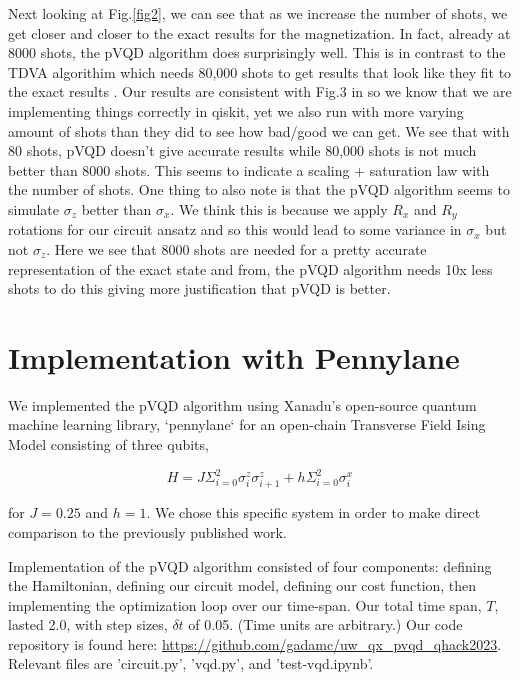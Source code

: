 \documentclass{article}
\begin{document}
 \newline \newline
 Next looking at Fig.\ref{fig2}, we can see that as we increase the number of shots, we get closer and closer to the exact results for the magnetization. In fact, already at 8000 shots, the pVQD algorithm does surprisingly well. This is in contrast to the TDVA algorithim which needs 80,000 shots to get results that look like they fit to the exact results \cite{PhysRevX.7.021050}. Our results are consistent with Fig.3 in \cite{Barison_2021} so we know that we are implementing things correctly in qiskit, yet we also run with more varying amount of shots than they did to see how bad/good we can get. We see that with 80 shots, pVQD doesn't give accurate results while  80,000 shots is not much better than 8000 shots. This seems to indicate a scaling + saturation law with the number of shots. One thing to also note is that the pVQD algorithm seems to simulate $\sigma_z$ better than $\sigma_x$. We think this is because we apply $R_x$ and $R_y$ rotations for our circuit ansatz and so this would lead to some variance in $\sigma_x$ but not $\sigma_z$. Here we see that 8000 shots are needed for a pretty accurate representation of the exact state and from\cite{Barison_2021}, the pVQD algorithm needs 10x less shots to do this giving more justification that pVQD is better.

\section{Implementation with Pennylane}

We implemented the pVQD algorithm using Xanadu's open-source quantum machine learning library, `pennylane` for an open-chain Transverse Field Ising Model consisting of three qubits,

\begin{equation}
    H = J\Sigma_{i=0}^{2} \sigma^z_i \sigma^z_{i+1} + h\Sigma_{i=0}^{2} \sigma^x_i
\end{equation}

for $J = 0.25$ and $h = 1$. We chose this specific system in order to make direct comparison to the previously published work\cite{Barison_2021}.

Implementation of the pVQD algorithm consisted of four components: defining the Hamiltonian, defining our circuit model, defining our cost function, then implementing the optimization loop over our time-span. Our total time span, $T$, lasted 2.0, with step sizes, $\delta t$ of 0.05. (Time units are arbitrary.)  Our code repository is found here: \url{https://github.com/gadamc/uw_qx_pvqd_qhack2023}. Relevant files are 'circuit.py', 'vqd.py', and 'test-vqd.ipynb'.
\end{document}
